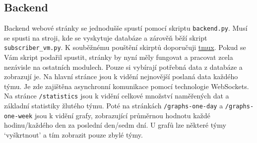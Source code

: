\subsection{Backend}
Backend webové stránky se jednodušše spustí pomocí skriptu \verb|backend.py|. Musí se spusti na stroji, kde se vyskytuje databáze a zárověň běží skript \verb|subscriber_vm.py|. K souběžnému pouštění skirptů doporučuji \href{URLhttps://github.com/tmux/tmux/wiki}{tmux}.
Pokud se Vám skript podařil spustit, stránky by nyní měly fungovat a pracovat zcela nezávisle na ostatních modulech. Pouze si vybírají potřebná data z databáze a zobrazují je.
Na hlavní stránce jsou k vidění nejnovější poslaná data každého týmu. Je zde zajištěna asynchronní komunikace pomocí technologie WebSockets.
Na stránce \verb|/statistics| jsou k vidění celkové množství naměřených dat a základní statistiky žlutého týmu. Poté na stránkách \verb|/graphs-one-day| a \verb|/graphs-one-week| jsou k vidění grafy, zobrazující průměrnou hodnotu každé hodinu/každého den za poslední den/sedm dní.
U grafů lze některé týmy `vyškrtnout' a tím zobrazit pouze zbylé týmy.